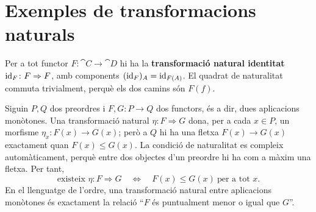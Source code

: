 \section{Exemples de transformacions naturals}\label{sec:exemples-transf}

\begin{exemple}
Per a tot functor $F\colon\cat{C}\to\cat{D}$ hi ha la \textbf{transformació natural identitat} $\operatorname{id}_F\colon F\Rightarrow F$, amb components $(\operatorname{id}_F)_A=\operatorname{id}_{F(A)}$. El quadrat de naturalitat commuta trivialment, perquè els dos camins són $F(f)$.
\end{exemple}

\begin{exemple}[Preordres]
Siguin $P,Q$ dos preordres i $F,G\colon P\to Q$ dos functors, és a dir, dues aplicacions monòtones. Una transformació natural $\eta\colon F\Rightarrow G$ dona, per a cada $x\in P$, un morfisme $\eta_x\colon F(x)\to G(x)$; però a $Q$ hi ha una fletxa $F(x)\to G(x)$ exactament quan $F(x)\leq G(x)$. La condició de naturalitat es compleix automàticament, perquè entre dos objectes d'un preordre hi ha com a màxim una fletxa. Per tant,
\[
\text{existeix }\eta\colon F\Rightarrow G
\quad\Longleftrightarrow\quad
F(x)\leq G(x)\ \text{per a tot }x.
\]
En el llenguatge de l'ordre, una transformació natural entre aplicacions monòtones és exactament la relació \enquote{$F$ és puntualment menor o igual que $G$}.
\end{exemple}

